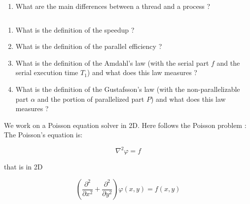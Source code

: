 \documentclass[11pt,a4paper]{article}
\begin{document}
\begin{exercise}
  $~$ %
\begin{enumerate}[label=(\alph*)]
	\item What are the main differences between a thread and a process ?

\end{enumerate}
\end{exercise}



\begin{exercise}
  $~$ %
\begin{enumerate}[label=(\alph*)]
	\item What is the definition of the speedup ?

	\item What is the definition of the parallel efficiency ?

	\item What is the definition of the Amdahl's law (with the serial part $f$ and the serial execution time $T_1$) and what does this law measures ?

	\item What is the definition of the Gustafsson's law (with the non-parallelizable part $\alpha$ and the portion of parallelized part $P$) and what does this law measures ?
\end{enumerate}
\end{exercise}















We work on a Poisson equation solver in 2D. Here follows the Poisson problem :
\\

The Poisson's equation is:

\begin{equation}
\nabla^2 \varphi = f
\end{equation}

that is in 2D

\begin{equation}
\left( \frac{\partial^2}{\partial x^2} + \frac{\partial^2}{\partial y^2} \right) \varphi(x,y) = f(x,y)\label{pde}
\end{equation}
\end{document}
